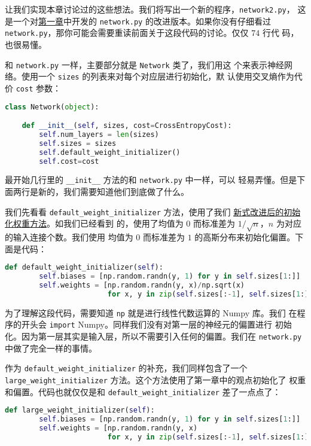 让我们实现本章讨论过的这些想法。我们将写出一个新的程序，\lstinline!network2.py!，
这是一个对\hyperref[sec:implementing_our_network_to_classify_digits]{第一章}中开发的 \lstinline!network.py! 的改进版本。如果你没有仔细看过
\lstinline!network.py!，那你可能会需要重读前面关于这段代码的讨论。仅仅 $74$ 行代
码，也很易懂。

和 \lstinline!network.py! 一样，主要部分就是 \lstinline!Network! 类了，我们用这
个来表示神经网络。使用一个 \lstinline!sizes! 的列表来对每个对应层进行初始化，默
认使用交叉熵作为代价 \lstinline!cost! 参数：
\begin{lstlisting}[language=Python]
class Network(object):

    def __init__(self, sizes, cost=CrossEntropyCost):
        self.num_layers = len(sizes)
        self.sizes = sizes
        self.default_weight_initializer()
        self.cost=cost
\end{lstlisting}

最开始几行里的 \lstinline!__init__! 方法的和 \lstinline!network.py! 中一样，可以
轻易弄懂。但是下面两行是新的，我们需要知道他们到底做了什么。

我们先看看 \lstinline!default_weight_initializer! 方法，使用了我们%
\hyperref[sec:weight_initialization]{新式改进后的初始化权重方法}。如我们已经看到
的，使用了均值为 $0$ 而标准差为 $1/\sqrt{n}$，$n$ 为对应的输入连接个数。我们使用
均值为 $0$ 而标准差为 $1$ 的高斯分布来初始化偏置。下面是代码：
\begin{lstlisting}[language=Python]
def default_weight_initializer(self):
        self.biases = [np.random.randn(y, 1) for y in self.sizes[1:]]
        self.weights = [np.random.randn(y, x)/np.sqrt(x) 
                        for x, y in zip(self.sizes[:-1], self.sizes[1:])]
\end{lstlisting}

为了理解这段代码，需要知道 \lstinline!np! 就是进行线性代数运算的 Numpy 库。我们
在程序的开头会 \lstinline!import! Numpy。同样我们没有对第一层的神经元的偏置进行
初始化。因为第一层其实是输入层，所以不需要引入任何的偏置。我们在
\lstinline!network.py! 中做了完全一样的事情。

作为 \lstinline!default_weight_initializer! 的补充，我们同样包含了一个
\lstinline!large_weight_initializer! 方法。这个方法使用了第一章中的观点初始化了
权重和偏置。代码也就仅仅是和 \lstinline!default_weight_initializer! 差了一点点了：
\begin{lstlisting}[language=Python]
def large_weight_initializer(self):
        self.biases = [np.random.randn(y, 1) for y in self.sizes[1:]]
        self.weights = [np.random.randn(y, x) 
                        for x, y in zip(self.sizes[:-1], self.sizes[1:])]
\end{lstlisting}


